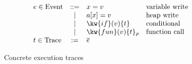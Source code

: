 \begin{figure}
\[\begin{array}{lcll}
e \in \Event & ::= & x = v & \text{variable write} \\
             & \mid & a[x] = v & \text{heap write} \\
             & \mid & \kw{if}(v)\{t\} & \text{conditional} \\
             & \mid & \kw{fun}(v)\{t\}_\rho & \text{function call} \\
t \in \Trace & := & \overline{e}
\end{array}\]
\caption{Concrete execution traces}\label{fig:concrete-traces}
\end{figure}
